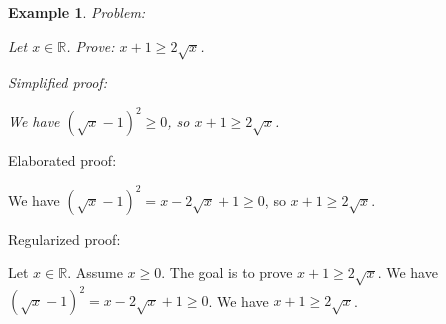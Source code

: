 \documentclass{article}
\newtheorem{example}{Example}
\begin{document}
\begin{example}
Problem:
\begin{tcolorbox}[colback=yellow!10, width=\linewidth]
Let $x\in\mathbb{R}$. Prove: $x + 1 \ge 2\sqrt{x}$.
\end{tcolorbox}

Simplified proof:
\begin{tcolorbox}[colback=blue!10, width=\linewidth]
We have $(\sqrt{x}-1)^2 \ge 0$, so $x+1 \ge 2\sqrt{x}$.
\end{tcolorbox}
\end{example}

Elaborated proof:
\begin{tcolorbox}[colback=green!10, width=\linewidth]
We have $(\sqrt{x}-1)^2 = x - 2\sqrt{x} + 1 \ge 0$, so $x+1 \ge 2\sqrt{x}$.
\end{tcolorbox}

Regularized proof:
\begin{tcolorbox}[colback=red!10, width=\linewidth]
Let $x\in\mathbb{R}$.
Assume $x\ge 0$.
The goal is to prove $x+1 \ge 2\sqrt{x}$.
We have ${(\sqrt{x}-1)}^2 = x - 2\sqrt{x} + 1 \ge 0$.
We have $x+1 \ge 2\sqrt{x}$.
\end{tcolorbox}
\end{document}
